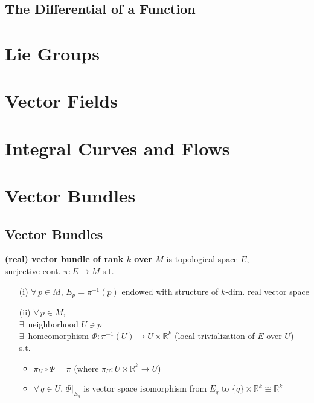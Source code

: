 \documentclass[twoside]{amsart}
\theoremstyle{plain}
\theoremstyle{definition}
\begin{document}
\subsection*{ The Differential of a Function }



\section{Lie Groups}




\section{Vector Fields}



\section{Integral Curves and Flows }





\section{Vector Bundles }

\subsection*{Vector Bundles }

\textbf{ (real) vector bundle of rank $k$ over $M$ } is topological space $E$, \\
\quad surjective cont. $\pi: E \to M$ s.t.
\begin{enumerate}
\item[(i)] $\forall \, p \in M$, $E_p = \pi^{-1}(p)$ endowed with structure of $k$-dim. real vector space
\item[(ii)] $\forall \, p \in M$, \\
  $\exists \, $ neighborhood $U \ni p$ \\
  $ \exists \, $ homeomorphism $\Phi : \pi^{-1}{(U)} \to U \times \mathbb{R}^k$ (local trivialization of $E$ over $U$) \\

s.t. 

\begin{itemize}
\item $\pi_U \circ \Phi = \pi$ (where $\pi_U : U \times \mathbb{R}^k \to U$) 
\item $\forall \, q\in U$, $\left. \Phi \right|_{E_q}$ is vector space isomorphism from $E_q$ to $\lbrace q \rbrace \times \mathbb{R}^k \cong \mathbb{R}^k$
\end{itemize}
\end{enumerate}
\end{document}

